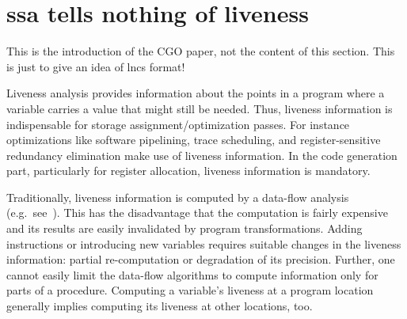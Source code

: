 \chapter*{ssa tells nothing of liveness}
\newcommand{\name}[1]{#1}
\newcommand{\eg}{e.g.}
\newcommand{\var}[1]{\mathtt{#1}}
\newcommand{\lao}{\name{LAO}} 
\newcommand{\firm}{\name{Firm}} 
\newcommand{\stm}{\name{STMicroelectronics}}





This is the introduction of the CGO paper, not the content of this section.
This is just to give an idea of lncs format!

Liveness analysis provides information about the points in a program where a variable carries a value that might still be needed.
Thus, liveness information is indispensable for storage assignment/optimization passes.
For instance optimizations like software pipelining, trace scheduling, and register-sensitive redundancy elimination make use of liveness information.
In the code generation part, particularly for register allocation, liveness information is mandatory.

Traditionally, liveness information is computed by a data-flow analysis (\eg\ see~\cite{cooper:2004:engineering}).
This has the disadvantage that the computation is fairly expensive and its results are easily invalidated by program transformations.
Adding instructions or introducing new variables requires suitable changes in the liveness information:
partial re-computation or degradation of its precision.
Further, one cannot easily limit the data-flow algorithms to compute information only for parts of a procedure.
Computing a variable's liveness at a program location generally implies computing its liveness at other locations, too.

